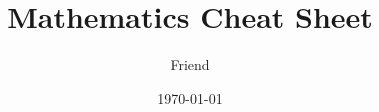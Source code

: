 \documentclass[12pt]{report}
\begin{document}
\title{Mathematics Cheat Sheet}
\author{Friend}
\date{\today}
\maketitle


 






\end{document}
